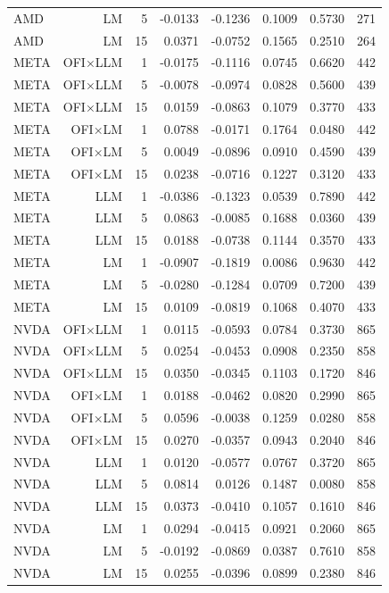 \begin{table}[htbp]
\begin{tabular}{lrrrrrrr}
AMD & LM & 5 & -0.0133 & -0.1236 & 0.1009 & 0.5730 & 271 \\
AMD & LM & 15 & 0.0371 & -0.0752 & 0.1565 & 0.2510 & 264 \\
META & OFI×LLM & 1 & -0.0175 & -0.1116 & 0.0745 & 0.6620 & 442 \\
META & OFI×LLM & 5 & -0.0078 & -0.0974 & 0.0828 & 0.5600 & 439 \\
META & OFI×LLM & 15 & 0.0159 & -0.0863 & 0.1079 & 0.3770 & 433 \\
META & OFI×LM & 1 & 0.0788 & -0.0171 & 0.1764 & 0.0480 & 442 \\
META & OFI×LM & 5 & 0.0049 & -0.0896 & 0.0910 & 0.4590 & 439 \\
META & OFI×LM & 15 & 0.0238 & -0.0716 & 0.1227 & 0.3120 & 433 \\
META & LLM & 1 & -0.0386 & -0.1323 & 0.0539 & 0.7890 & 442 \\
META & LLM & 5 & 0.0863 & -0.0085 & 0.1688 & 0.0360 & 439 \\
META & LLM & 15 & 0.0188 & -0.0738 & 0.1144 & 0.3570 & 433 \\
META & LM & 1 & -0.0907 & -0.1819 & 0.0086 & 0.9630 & 442 \\
META & LM & 5 & -0.0280 & -0.1284 & 0.0709 & 0.7200 & 439 \\
META & LM & 15 & 0.0109 & -0.0819 & 0.1068 & 0.4070 & 433 \\
NVDA & OFI×LLM & 1 & 0.0115 & -0.0593 & 0.0784 & 0.3730 & 865 \\
NVDA & OFI×LLM & 5 & 0.0254 & -0.0453 & 0.0908 & 0.2350 & 858 \\
NVDA & OFI×LLM & 15 & 0.0350 & -0.0345 & 0.1103 & 0.1720 & 846 \\
NVDA & OFI×LM & 1 & 0.0188 & -0.0462 & 0.0820 & 0.2990 & 865 \\
NVDA & OFI×LM & 5 & 0.0596 & -0.0038 & 0.1259 & 0.0280 & 858 \\
NVDA & OFI×LM & 15 & 0.0270 & -0.0357 & 0.0943 & 0.2040 & 846 \\
NVDA & LLM & 1 & 0.0120 & -0.0577 & 0.0767 & 0.3720 & 865 \\
NVDA & LLM & 5 & 0.0814 & 0.0126 & 0.1487 & 0.0080 & 858 \\
NVDA & LLM & 15 & 0.0373 & -0.0410 & 0.1057 & 0.1610 & 846 \\
NVDA & LM & 1 & 0.0294 & -0.0415 & 0.0921 & 0.2060 & 865 \\
NVDA & LM & 5 & -0.0192 & -0.0869 & 0.0387 & 0.7610 & 858 \\
NVDA & LM & 15 & 0.0255 & -0.0396 & 0.0899 & 0.2380 & 846 \\

\end{tabular}
\end{table}
